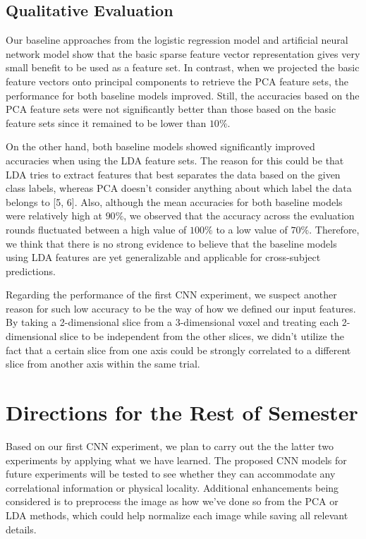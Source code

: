 \documentclass{article} %
\begin{document}
\subsection{Qualitative Evaluation}

Our baseline approaches from the logistic regression model and artificial neural network model show that the basic sparse feature vector representation gives very small benefit to be used as a feature set. In contrast, when we projected the basic feature vectors onto principal components to retrieve the PCA feature sets, the performance for both baseline models improved. Still, the accuracies based on the PCA feature sets were not significantly better than those based on the basic feature sets since it remained to be lower than $10\%$.

On the other hand, both baseline models showed significantly improved accuracies when using the LDA feature sets. The reason for this could be that LDA tries to extract features that best separates the data based on the given class labels, whereas PCA doesn't consider anything about which label the data belongs to [5, 6]. Also, although the mean accuracies for both baseline models were relatively high at $90\%$, we observed that the accuracy across the evaluation rounds fluctuated between a high value of $100\%$ to a low value of $70\%$. Therefore, we think that there is no strong evidence to believe that the baseline models using LDA features are yet generalizable and applicable for cross-subject predictions.

Regarding the performance of the first CNN experiment, we suspect another reason for such low accuracy to be the way of how we defined our input features. By taking a 2-dimensional slice from a 3-dimensional voxel and treating each 2-dimensional slice to be independent from the other slices, we didn't utilize the fact that a certain slice from one axis could be strongly correlated to a different slice from another axis within the same trial.

\section{Directions for the Rest of Semester}

Based on our first CNN experiment, we plan to carry out the the latter two experiments by applying what we have learned. The proposed CNN models for future experiments will be tested to see whether they can accommodate any correlational information or physical locality. Additional enhancements being considered is to preprocess the image as how we've done so from the PCA or LDA methods, which could help normalize each image while saving all relevant details.
\end{document}
